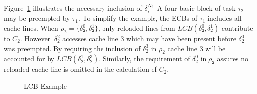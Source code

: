 %
%
%
%
%
% 
%
%

Figure~\ref{fig:test} illustrates the necessary inclusion of
${\delta_i^{N_i}}$. A four basic block of task ${\tau_2}$
may be preempted by ${\tau_1}$. To simplify the example, the
ECBs of ${\tau_1}$ includes all cache lines. When ${\rho_2 =
  \{\delta_2^0, \delta_2^1\}}$, only reloaded lines from
${LCB(\delta_2^0, \delta_2^1)}$ contribute to
${C_2}$. However, ${\delta_2^2}$ accesses cache line 3 which may have
been present before ${\delta_2^0}$ was preempted. By requiring the
inclusion of ${\delta_2^3}$ in ${\rho_2}$ cache line 3 will be
accounted for by ${LCB(\delta_2^1, \delta_2^3)}$. Similarly, the
requirement of ${\delta_2^0}$ in ${\rho_2}$ assures no reloaded cache
line is omitted in the calculation of ${C_2}$.

\begin{figure}[!htb]
  \centering
  \def\svgwidth{250pt}
  
  \vspace{5pt}
  \caption{LCB Example}
  \label{fig:test}
\end{figure}

%
%
